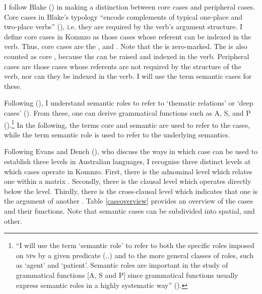 I follow Blake (\citeyear{Blake:case}) in making a distinction between core cases and peripheral cases. Core cases in Blake's typology ``encode complements of typical one-place and two-place  verbs'' (\citeyear[32]{Blake:case}), i.e. they are required by the verb's argument structure. I define core cases in Komnzo as those cases whose referent can be indexed in the verb. Thus, core cases are the ,  and  . Note that the  is zero-marked. The  is also counted as core , because the  can be raised and indexed in the verb. Peripheral cases are those cases whose referents are not required by the structure of the verb, nor can they be indexed in the verb. I will use the term semantic cases for these.%

Following (\citealt{Andrews:2007nounphrase}), I understand semantic roles to refer to `thematic relations' or `deep cases' (\citealt{Fillmore:1968case}). From these, one can derive grammatical functions such as A, S, and P (\citealt{Dixon:1972dyirbal}).\footnote{``I will use the term ‘semantic role’ to refer to both the specific roles imposed on \textsc{np}s by a given predicate (..) and to the more general classes of roles, such as ‘agent’ and ‘patient’. Semantic roles are important in the study of grammatical functions [A, S and P] since grammatical functions usually express semantic roles in a highly systematic way'' (\citealt[136]{Andrews:2007nounphrase}).} In the following, the terms core  and semantic  are used to refer to the cases, while the term semantic role is used to refer to the underlying semantics.%

Following Evans and Dench (\citeyear{Evans:1988ge}), who discuss the ways in which case can be used to establish three levels in Australian languages, I recognise three distinct levels at which cases operate in Komnzo. First, there is the adnominal level which relates one  within a matrix . Secondly, there is the clausal level which operates directly below the  level. Thirdly, there is the cross-clausal level which indicates that one  is the argument of another . Table \ref{caseoverview} provides an overview of the cases and their functions. Note that semantic cases can be subdivided into spatial,  and other.

